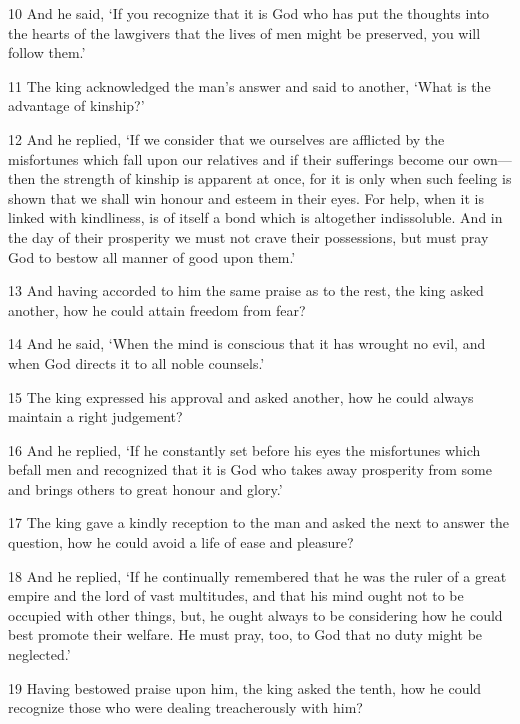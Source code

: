 \par 10 And he said, ‘If you recognize that it is God who has put the thoughts into the hearts of the lawgivers that the lives of men might be preserved, you will follow them.’

\par 11 The king acknowledged the man's answer and said to another, ‘What is the advantage of kinship?’

\par 12 And he replied, ‘If we consider that we ourselves are afflicted by the misfortunes which fall upon our relatives and if their sufferings become our own—then the strength of kinship is apparent at once, for it is only when such feeling is shown that we shall win honour and esteem in their eyes. For help, when it is linked with kindliness, is of itself a bond which is altogether indissoluble. And in the day of their prosperity we must not crave their possessions, but must pray God to bestow all manner of good upon them.’

\par 13 And having accorded to him the same praise as to the rest, the king asked another, how he could attain freedom from fear?

\par 14 And he said, ‘When the mind is conscious that it has wrought no evil, and when God directs it to all noble counsels.’

\par 15 The king expressed his approval and asked another, how he could always maintain a right judgement?

\par 16 And he replied, ‘If he constantly set before his eyes the misfortunes which befall men and recognized that it is God who takes away prosperity from some and brings others to great honour and glory.’

\par 17 The king gave a kindly reception to the man and asked the next to answer the question, how he could avoid a life of ease and pleasure?

\par 18 And he replied, ‘If he continually remembered that he was the ruler of a great empire and the lord of vast multitudes, and that his mind ought not to be occupied with other things, but, he ought always to be considering how he could best promote their welfare. He must pray, too, to God that no duty might be neglected.’

\par 19 Having bestowed praise upon him, the king asked the tenth, how he could recognize those who were dealing treacherously with him?

